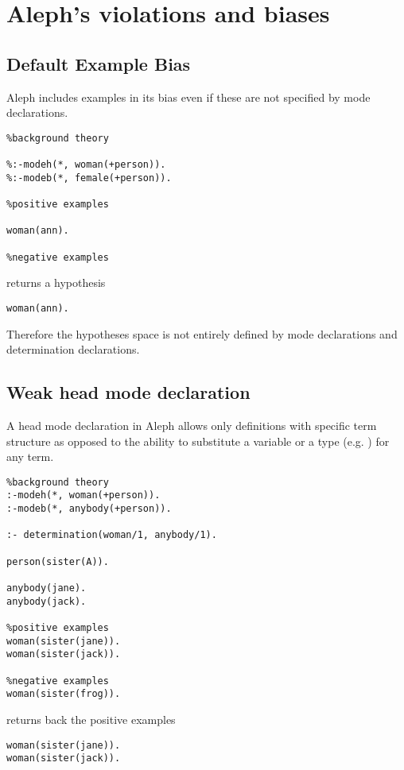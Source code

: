 \section{Aleph's violations and biases}

\subsection{Default Example Bias}
Aleph includes examples in its bias even if these are not specified by mode declarations.

\begin{lstlisting}
%background theory

%:-modeh(*, woman(+person)).
%:-modeb(*, female(+person)).

%positive examples

woman(ann).

%negative examples
\end{lstlisting}

returns a hypothesis
\begin{lstlisting}
woman(ann).
\end{lstlisting}

Therefore the hypotheses space is not entirely defined by mode declarations and determination declarations.

\subsection{Weak head mode declaration}
A head mode declaration in Aleph allows only definitions with specific term structure as opposed to
the ability to substitute a variable or a type (e.g. ) for any term.

\begin{lstlisting}
%background theory
:-modeh(*, woman(+person)).
:-modeb(*, anybody(+person)).

:- determination(woman/1, anybody/1).

person(sister(A)).

anybody(jane).
anybody(jack).

%positive examples
woman(sister(jane)).
woman(sister(jack)).

%negative examples
woman(sister(frog)).
\end{lstlisting}

returns back the positive examples
\begin{lstlisting}
woman(sister(jane)).
woman(sister(jack)).
\end{lstlisting}


